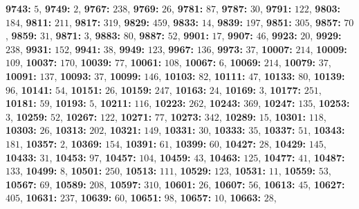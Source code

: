 \textsf{\bfseries 9743:} $5$, \textsf{\bfseries 9749:} $2$, \textsf{\bfseries 9767:} $238$, \textsf{\bfseries 9769:} $26$, \textsf{\bfseries 9781:} $87$, \textsf{\bfseries 9787:} $30$, \textsf{\bfseries 9791:} $122$, \textsf{\bfseries 9803:} $184$, \textsf{\bfseries 9811:} $211$, \textsf{\bfseries 9817:} $319$, \textsf{\bfseries 9829:} $459$, \textsf{\bfseries 9833:} $14$, \textsf{\bfseries 9839:} $197$, \textsf{\bfseries 9851:} $305$, \textsf{\bfseries 9857:} $70$, \textsf{\bfseries 9859:} $31$, \textsf{\bfseries 9871:} $3$, \textsf{\bfseries 9883:} $80$, \textsf{\bfseries 9887:} $52$, \textsf{\bfseries 9901:} $17$, \textsf{\bfseries 9907:} $46$, \textsf{\bfseries 9923:} $20$, \textsf{\bfseries 9929:} $238$, \textsf{\bfseries 9931:} $152$, \textsf{\bfseries 9941:} $38$, \textsf{\bfseries 9949:} $123$, \textsf{\bfseries 9967:} $136$, \textsf{\bfseries 9973:} $37$, \textsf{\bfseries 10007:} $214$, \textsf{\bfseries 10009:} $109$, \textsf{\bfseries 10037:} $170$, \textsf{\bfseries 10039:} $77$, \textsf{\bfseries 10061:} $108$, \textsf{\bfseries 10067:} $6$, \textsf{\bfseries 10069:} $214$, \textsf{\bfseries 10079:} $37$, \textsf{\bfseries 10091:} $137$, \textsf{\bfseries 10093:} $37$, \textsf{\bfseries 10099:} $146$, \textsf{\bfseries 10103:} $82$, \textsf{\bfseries 10111:} $47$, \textsf{\bfseries 10133:} $80$, \textsf{\bfseries 10139:} $96$, \textsf{\bfseries 10141:} $54$, \textsf{\bfseries 10151:} $26$, \textsf{\bfseries 10159:} $247$, \textsf{\bfseries 10163:} $24$, \textsf{\bfseries 10169:} $3$, \textsf{\bfseries 10177:} $251$, \textsf{\bfseries 10181:} $59$, \textsf{\bfseries 10193:} $5$, \textsf{\bfseries 10211:} $116$, \textsf{\bfseries 10223:} $262$, \textsf{\bfseries 10243:} $369$, \textsf{\bfseries 10247:} $135$, \textsf{\bfseries 10253:} $3$, \textsf{\bfseries 10259:} $52$, \textsf{\bfseries 10267:} $122$, \textsf{\bfseries 10271:} $77$, \textsf{\bfseries 10273:} $342$, \textsf{\bfseries 10289:} $15$, \textsf{\bfseries 10301:} $118$, \textsf{\bfseries 10303:} $26$, \textsf{\bfseries 10313:} $202$, \textsf{\bfseries 10321:} $149$, \textsf{\bfseries 10331:} $30$, \textsf{\bfseries 10333:} $35$, \textsf{\bfseries 10337:} $51$, \textsf{\bfseries 10343:} $181$, \textsf{\bfseries 10357:} $2$, \textsf{\bfseries 10369:} $154$, \textsf{\bfseries 10391:} $61$, \textsf{\bfseries 10399:} $60$, \textsf{\bfseries 10427:} $28$, \textsf{\bfseries 10429:} $145$, \textsf{\bfseries 10433:} $31$, \textsf{\bfseries 10453:} $97$, \textsf{\bfseries 10457:} $104$, \textsf{\bfseries 10459:} $43$, \textsf{\bfseries 10463:} $125$, \textsf{\bfseries 10477:} $41$, \textsf{\bfseries 10487:} $133$, \textsf{\bfseries 10499:} $8$, \textsf{\bfseries 10501:} $250$, \textsf{\bfseries 10513:} $111$, \textsf{\bfseries 10529:} $123$, \textsf{\bfseries 10531:} $11$, \textsf{\bfseries 10559:} $53$, \textsf{\bfseries 10567:} $69$, \textsf{\bfseries 10589:} $208$, \textsf{\bfseries 10597:} $310$, \textsf{\bfseries 10601:} $26$, \textsf{\bfseries 10607:} $56$, \textsf{\bfseries 10613:} $45$, \textsf{\bfseries 10627:} $405$, \textsf{\bfseries 10631:} $237$, \textsf{\bfseries 10639:} $60$, \textsf{\bfseries 10651:} $98$, \textsf{\bfseries 10657:} $10$, \textsf{\bfseries 10663:} $28$, 
